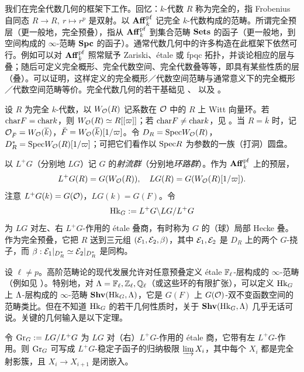 我们在完全代数几何的框架下工作。回忆：$k$-代数 $R$ 称为完全的，指 Frobenius 自同态 $R\to R,\ r\mapsto r^p$ 是双射。以 ${\mathbf{Aff}}_k^{\operatorname{pf}}$ 记完全 $k$-代数构成的范畴。所谓完全预层（更一般地，完全预叠），指从 ${\mathbf{Aff}}_k^{\operatorname{pf}}$ 到集合范畴 $\mathbf{Sets}$ 的函子（更一般地，到空间构成的 $\infty$-范畴 ${\mathbf{Spc}}$ 的函子）。通常代数几何中的许多构造在此框架下依然可行。例如可以对 ${\mathbf{Aff}}_k^{\operatorname{pf}}$ 照常赋予 Zariski、étale 或 fpqc 拓扑，并谈论相应的层与叠；随后可定义完全概形、完全代数空间、完全代数叠等等，即具有某些性质的层（叠）。可以证明，这样定义的完全概形／代数空间范畴与通常意义下的完全概形／代数空间范畴等价。完全代数几何的若干基础见 \cite[Appendix A]{Zhu-Satake-Mixed}、\cite{Bhatt-Scholze-Witt} 以及 \cite[\S A.1]{Xiao-Zhu-Cycle}。

设 $R$ 为完全 $k$-代数，以 $W_{\mathcal O}(R)$ 记系数在 ${\mathcal O}$ 中的 $R$ 上 Witt 向量环。若 ${\operatorname{char}} F={\operatorname{char}} k$，则 $W_{\mathcal O}(R)\simeq R[[\varpi]]$；若 ${\operatorname{char}} F\neq {\operatorname{char}} k$，见 \cite[Sect.~0.5]{Zhu-Satake-Mixed}。当 $R=\overline k$ 时，记 ${\mathcal O}_{\breve F}=W_{\mathcal O}(\overline k)$，$\breve F=W_{\mathcal O}(\overline k)[1/\varpi]$。令 $D_R={\operatorname{Spec}} W_{\mathcal O}(R)$，$D_R^*={\operatorname{Spec}} W_{\mathcal O}(R)[1/\varpi]$；可把它们看作以 ${\operatorname{Spec}} R$ 为参数的一族（打洞）圆盘。

以 $L^+G$（分别地 $LG$）记 $G$ 的\emph{射流群}（分别地\emph{环路群}）。作为 ${\mathbf{Aff}}_k^{\operatorname{pf}}$ 上的预层，
\begin{equation*}\label{E:jet and loop}
L^+G(R)=G(W_{\mathcal O}(R)),\quad LG(R)=G(W_{\mathcal O}(R)[1/\varpi]).
\end{equation*}
注意 $L^+G(k)=G({\mathcal O})$，$LG(k)=G(F)$。令
\[
{\operatorname{Hk}}_G:=L^+G\backslash LG/L^+G
\]
为 $LG$ 对左、右 $L^+G$-作用的 étale 叠商，有时称为 $G$ 的（球）局部 Hecke 叠。作为完全预叠，它把 $R$ 送到三元组 $({\mathcal E}_1,{\mathcal E}_2,\beta)$，其中 ${\mathcal E}_1,{\mathcal E}_2$ 是 $D_R$ 上的两个 $G$-挠子，而 $\beta:{\mathcal E}_1|_{D_R^*}\simeq{\mathcal E}_2|_{D_R^*}$ 是同构。

设 $\ell\neq p$。高阶范畴论的现代发展允许对任意预叠定义 étale ${\mathbb F}_\ell$-层构成的 $\infty$-范畴（例如见 \cite{Hemo-Zhu-Unipotent}）。特别地，对 ${\Lambda}={\mathbb F}_\ell,{\mathbb Z}_\ell,{\mathbb Q}_\ell$（或这些环的有限扩张），可以定义 ${\operatorname{Hk}}_G$ 上 ${\Lambda}$-层构成的 $\infty$-范畴 ${\mathbf{Shv}}({\operatorname{Hk}}_G,{\Lambda})$，它是 $G(F)$ 上 $G({\mathcal O})$-双不变函数空间的范畴类比。但在不知道 ${\operatorname{Hk}}_G$ 的若干几何性质时，关于 ${\mathbf{Shv}}({\operatorname{Hk}}_G,{\Lambda})$ 几乎无话可说。关键的几何输入是以下定理。

\begin{thm}\label{affGrass}
令 ${\operatorname{Gr}}_G:=LG/L^+G$ 为 $LG$ 对（右）$L^+G$-作用的 étale 商，它带有左 $L^+G$-作用。则 ${\operatorname{Gr}}_G$ 可写成 $L^+G$-稳定子函子的归纳极限 $\varinjlim X_i$，其中每个 $X_i$ 都是完全射影簇，且 $X_i\to X_{i+1}$ 是闭嵌入。
\end{thm}

